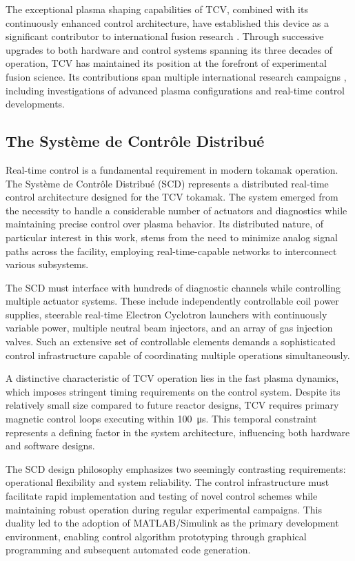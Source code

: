 The exceptional plasma shaping capabilities of TCV, combined with its continuously enhanced control architecture, have established this device as a significant contributor to international fusion research \cite{duval_experimental_2024}. Through successive upgrades to both hardware and control systems spanning its three decades of operation, TCV has maintained its position at the forefront of experimental fusion science. Its contributions span multiple international research campaigns \cite{joffrin_overview_2024}, including investigations of advanced plasma configurations and real-time control developments.

\subsection{The Système de Contrôle Distribué}
\label{sec:scd}
Real-time control is a fundamental requirement in modern tokamak operation. The Système de Contrôle Distribué (SCD) \cite{le_distributed_2014,anand_distributed_2017,galperti_overview_2024} represents a distributed real-time control architecture designed for the TCV tokamak. The system emerged from the necessity to handle a considerable number of actuators and diagnostics while maintaining precise control over plasma behavior. Its distributed nature, of particular interest in this work, stems from the need to minimize analog signal paths across the facility, employing real-time-capable networks to interconnect various subsystems.

The SCD must interface with hundreds of diagnostic channels while controlling multiple actuator systems. These include independently controllable coil power supplies, steerable real-time Electron Cyclotron launchers with continuously variable power, multiple neutral beam injectors, and an array of gas injection valves. Such an extensive set of controllable elements demands a sophisticated control infrastructure capable of coordinating multiple operations simultaneously.

A distinctive characteristic of TCV operation lies in the fast plasma dynamics, which imposes stringent timing requirements on the control system. Despite its relatively small size compared to future reactor designs, TCV requires primary magnetic control loops executing within \SI{100}{\micro\second}. This temporal constraint represents a defining factor in the system architecture, influencing both hardware and software designs.

The SCD design philosophy emphasizes two seemingly contrasting requirements: operational flexibility and system reliability. The control infrastructure must facilitate rapid implementation and testing of novel control schemes while maintaining robust operation during regular experimental campaigns. This duality led to the adoption of MATLAB/Simulink as the primary development environment, enabling control algorithm prototyping through graphical programming and subsequent automated code generation.

